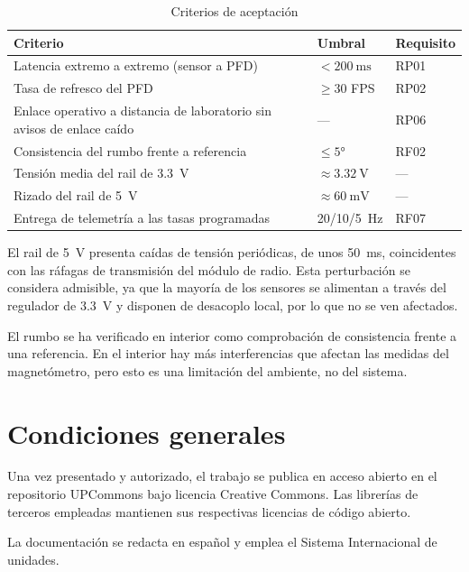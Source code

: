 \begin{table}[H]
    \centering
    \caption{Criterios de aceptación}
    \label{tab:pliego_aceptacion}
    \begin{tabularx}{\linewidth}{X l l}
        \toprule
        \textbf{Criterio} & \textbf{Umbral} & \textbf{Requisito} \\
        \midrule
        Latencia extremo a extremo (sensor a PFD) & $<\SI{200}{\milli\second}$ & RP01 \\
        Tasa de refresco del PFD & $\geq 30$ FPS & RP02 \\
        Enlace operativo a distancia de laboratorio sin avisos de enlace caído & --- & RP06 \\
        Consistencia del rumbo frente a referencia & $\leq\ang{5}$ & RF02 \\
        Tensión media del rail de \SI{3.3}{\volt} & $\approx\SI{3.32}{\volt}$ & --- \\
        Rizado del rail de \SI{5}{\volt} & $\approx\SI{60}{\milli\volt}$ & --- \\
        Entrega de telemetría a las tasas programadas & \SI{20}{}/\SI{10}{}/\SI{5}{\hertz} & RF07 \\
        \bottomrule
    \end{tabularx}
\end{table}

El rail de \SI{5}{\volt} presenta caídas de tensión periódicas, de unos \SI{50}{\milli\second}, coincidentes con las ráfagas de transmisión del módulo de radio. Esta perturbación se considera admisible, ya que la mayoría de los sensores se alimentan a través del regulador de \SI{3.3}{\volt} y disponen de desacoplo local, por lo que no se ven afectados.

El rumbo se ha verificado en interior como comprobación de consistencia frente a una referencia.  En el interior hay más interferencias que afectan las medidas del magnetómetro, pero esto es una limitación del ambiente, no del sistema. 


\chapter{Condiciones generales}
\label{ch:pliego_generales}

Una vez presentado y autorizado, el trabajo se publica en acceso abierto en el repositorio UPCommons bajo licencia Creative Commons. Las librerías de terceros empleadas mantienen sus respectivas licencias de código abierto.

La documentación se redacta en español y emplea el Sistema Internacional de unidades.

